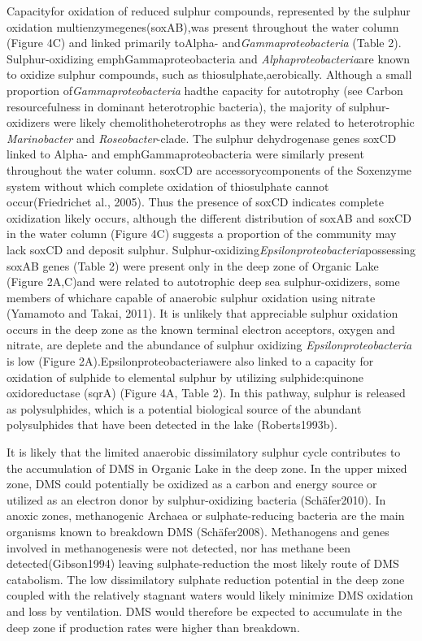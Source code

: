 {{Capacityfor oxidation of reduced sulphur compounds, represented by the sulphur oxidation multienzymegenes(soxAB),was present throughout the water column (Figure 4C) and linked primarily toAlpha- and\emph{Gammaproteobacteria} (Table 2). Sulphur-oxidizing emph{Gammaproteobacteria} and \emph{Alphaproteobacteria}are known to oxidize sulphur compounds, such as thiosulphate,aerobically. Although a small proportion of\emph{Gammaproteobacteria} hadthe capacity for autotrophy (see Carbon resourcefulness in dominant heterotrophic bacteria), the majority of sulphur-oxidizers were likely chemolithoheterotrophs as they were related to heterotrophic \emph{Marinobacter} and \emph{Roseobacter}-clade. The sulphur dehydrogenase genes soxCD linked to Alpha- and emph{Gammaproteobacteria} were similarly present throughout the water column. soxCD are accessorycomponents of the Soxenzyme system without which complete oxidation of thiosulphate cannot occur(Friedrichet al., 2005). Thus the presence of soxCD indicates complete oxidization likely occurs, although the different distribution of soxAB and soxCD in the water column (Figure 4C) suggests a proportion of the community may lack soxCD and deposit sulphur. Sulphur-oxidizing\emph{Epsilonproteobacteria}possessing soxAB genes (Table 2) were present only in the deep zone of Organic Lake (Figure 2A,C)and were related to autotrophic deep sea sulphur-oxidizers, some members of whichare capable of anaerobic sulphur oxidation using nitrate (Yamamoto and Takai, 2011). It is unlikely that appreciable sulphur oxidation occurs in the deep zone as the known terminal electron acceptors, oxygen and nitrate, are deplete and the abundance of sulphur oxidizing \emph{Epsilonproteobacteria} is low (Figure 2A).Epsilonproteobacteriawere also linked to a capacity for oxidation of sulphide to elemental sulphur by utilizing sulphide:quinone oxidoreductase (sqrA) (Figure 4A, Table 2). In this pathway, sulphur is released as polysulphides, which is a potential biological source of the abundant polysulphides that have been detected in the lake (Roberts1993b).

It is likely that the limited anaerobic dissimilatory sulphur cycle contributes to the accumulation of \ac{DMS} in Organic Lake in the deep zone. In the upper mixed zone, \ac{DMS} could potentially be oxidized as a carbon and energy source or utilized as an electron donor by sulphur-oxidizing bacteria (Schäfer2010). In anoxic zones, methanogenic Archaea or sulphate-reducing bacteria are the main organisms known to breakdown \ac{DMS} (Schäfer2008). Methanogens and genes involved in methanogenesis were not detected, nor has methane been detected(Gibson1994) leaving sulphate-reduction the most likely route of \ac{DMS} catabolism. The low dissimilatory sulphate reduction potential in the deep zone coupled with the relatively stagnant waters would likely minimize \ac{DMS} oxidation and loss by ventilation. \ac{DMS} would therefore be expected to accumulate in the deep zone if production rates were higher than breakdown.

}}
